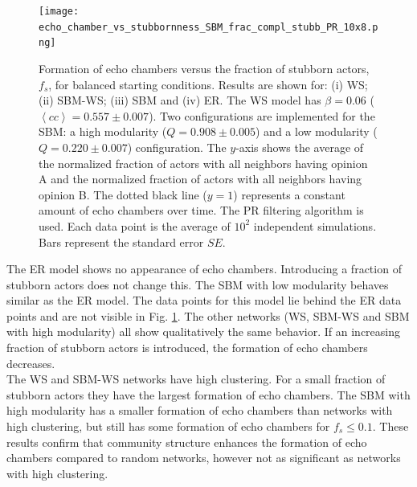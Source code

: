 \documentclass[11 pt , letterpaper , twoside , openright]{book}
\begin{document}
\begin{figure}[H]
	\texttt{[image: echo\_chamber\_vs\_stubbornness\_SBM\_frac\_compl\_stubb\_PR\_10x8.png]}
	\captionsetup{format=plain}
	\caption[Formation of echo chambers versus fraction of stubborn actors for the PR filtering algorithm and balanced starting conditions.]{Formation of echo chambers versus the fraction of stubborn actors, $f_s$, for balanced starting conditions. Results are shown for: (i) WS; (ii) SBM-WS; (iii) SBM and (iv) ER. The WS model has $\beta = 0.06$ ($\left<cc\right> = 0.557 \pm 0.007$). Two configurations are implemented for the SBM: a high modularity ($Q = 0.908 \pm 0.005$) and a low modularity ($Q = 0.220 \pm 0.007$) configuration. The $y$-axis shows the average of the normalized fraction of actors with all neighbors having opinion A and the normalized fraction of actors with all neighbors having opinion B. The dotted black line ($y=1$) represents a constant amount of echo chambers over time. The PR filtering algorithm is used. Each data point is the average of $10^2$ independent simulations. Bars represent the standard error $SE$.}
\label{echo_vs_frac_complStubb}
\end{figure}
\noindent
The ER model shows no appearance of echo chambers. Introducing a fraction of stubborn actors does not change this. The SBM with low modularity behaves similar as the ER model. The data points for this model lie behind the ER data points and are not visible in Fig. \ref{echo_vs_frac_complStubb}. The other networks (WS, SBM-WS and SBM with high modularity) all show qualitatively the same behavior. If an increasing fraction of stubborn actors is introduced, the formation of echo chambers decreases.\\
\newline
The WS and SBM-WS networks have high clustering. For a small fraction of stubborn actors they have the largest formation of echo chambers. The SBM with high modularity has a smaller formation of echo chambers than networks with high clustering, but still has some formation of echo chambers for $f_s \leqslant 0.1$. These results confirm that community structure enhances the formation of echo chambers compared to random networks, however not as significant as networks with high clustering.
\end{document}
